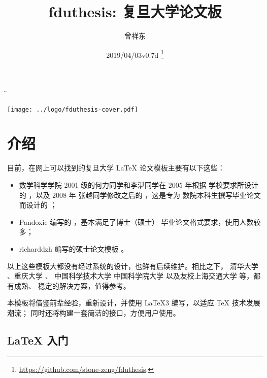 \documentclass{fdudoc}
\title{\textcolor{MaterialIndigo800}{%
  \textbf{fduthesis: 复旦大学论文\xpinyin[font=\sffamily]{模}{mu2}板}}}
\author{曾祥东}
\date{2019/04/03\quad v0.7d%
  \thanks{\url{https://github.com/stone-zeng/fduthesis}.}}
\begin{document}
\DeleteShortVerb\"


\maketitle
\vfill
\begin{center}
  \texttt{[image: ../logo/fduthesis-cover.pdf]}
\end{center}
\vfill
\thispagestyle{plain}
\clearpage

\tableofcontents


\section{介绍}

目前，在网上可以找到的复旦大学 \LaTeX{} 论文模板主要有以下这些：
\begin{itemize}
  \item 数学科学学院 2001 级的何力同学和李湛同学在 2005 年根据
    学校要求所设计的 ，以及 2008 年
    张越同学修改之后的 ，这是专为
    数院本科生撰写毕业论文而设计的
    ；
  \item Pandoxie 编写的 
    ，基本满足了博士（硕士）
    毕业论文格式要求，使用人数较多；
  \item richarddzh 编写的硕士论文模板 
    。
\end{itemize}
以上这些模板大都没有经过系统的设计，也鲜有后续维护。相比之下，
清华大学 、重庆大学 、
中国科学技术大学  中国科学院大学 
以及友校上海交通大学 等，都有成熟、
稳定的解决方案，值得参考。

本模板将借鉴前辈经验，重新设计，并使用 \LaTeX3
 编写，以适应 \TeX{} 技术发展潮流；
同时还将构建一套简洁的接口，方便用户使用。

\subsection*{\LaTeX{} 入门}
\end{document}
